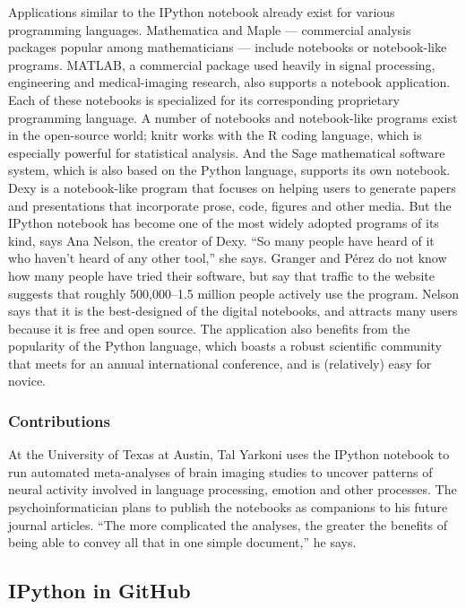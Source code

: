 Applications similar to the IPython notebook
already exist for various programming
languages. Mathematica and Maple — commercial
analysis packages popular among mathematicians
— include notebooks or notebook-like
programs. MATLAB, a commercial package
used heavily in signal processing, engineering
and medical-imaging research, also supports a
notebook application. Each of these notebooks
is specialized for its corresponding proprietary
programming language.
A number of notebooks and notebook-like
programs exist in the open-source world; knitr
works with the R coding language, which is
especially powerful for statistical analysis. And
the Sage mathematical software system, which
is also based on the Python language, supports
its own notebook. Dexy is a notebook-like program
that focuses on helping users to generate
papers and presentations that incorporate prose,
code, figures and other media.
But the IPython notebook has become one
of the most widely adopted programs of its
kind, says Ana Nelson, the creator of Dexy. “So
many people have heard of it who haven’t heard
of any other tool,” she says. Granger and Pérez
do not know how many people have tried their
software, but say that traffic to the website suggests
that roughly 500,000–1.5 million people
actively use the program. Nelson says that it is
the best-designed of the digital notebooks, and
attracts many users because it is free and open
source. The application also benefits from the
popularity of the Python language, which boasts
a robust scientific community that meets for an
annual international conference, and is (relatively)
easy for novice.

\subsubsection{Contributions}

At the University of Texas at Austin, Tal Yarkoni
uses the IPython notebook to run automated
meta-analyses of brain imaging studies to
uncover patterns of neural activity involved in
language processing, emotion and other processes.
The psychoinformatician plans to publish
the notebooks as companions to his future
journal articles. “The more complicated the
analyses, the greater the benefits of being able to convey all that in one simple document,” he says.
\cite{shen2014interactive}

\subsection{IPython in GitHub}
% 